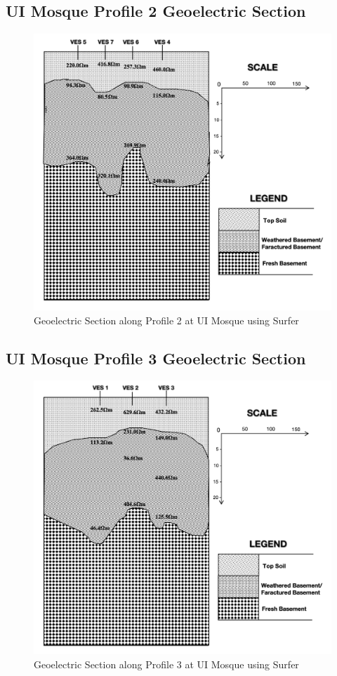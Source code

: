 \documentclass[12pt,a4paper]{report}
\begin{document}
\subsection{UI Mosque Profile 2 Geoelectric Section}
\begin{figure}[H]
    \centering
    \includegraphics[width=1.0\textwidth]{UI_Mosque_Profile2.png}
    \caption{Geoelectric Section along Profile 2 at UI Mosque using Surfer}
    \label{fig:UI_Mosque_Surfer_Profile_2}
\end{figure}

\subsection{UI Mosque Profile 3 Geoelectric Section}
\begin{figure}[H]
    \centering
    \includegraphics[width=1.0\textwidth]{UI_Mosque_Profile3.png}
    \caption{Geoelectric Section along Profile 3 at UI Mosque using Surfer}
    \label{fig:UI_Mosque_Surfer_Profile_3}
\end{figure}
\end{document}
